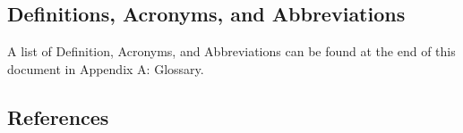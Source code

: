 \subsection{Definitions, Acronyms, and Abbreviations}
\label{sec:definitions}

A list of Definition, Acronyms, and Abbreviations can be found at the end of
this document in Appendix A: Glossary.
\par

\subsection{References}
\label{sec:references}

